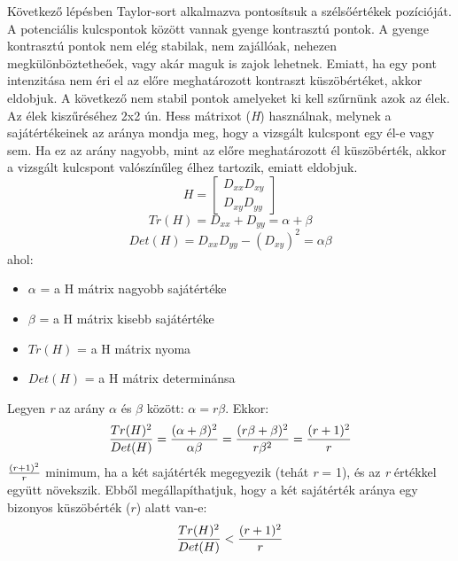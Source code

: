 \documentclass[12pt]{report}
\begin{document}
\begin{enumerate}
\begin{enumerate}
\begin{center}
                                    \end{center}
                                    Következő lépésben Taylor-sort alkalmazva pontosítsuk a szélsőértékek pozícióját. A potenciális kulcspontok között vannak gyenge kontrasztú pontok. A gyenge kontrasztú pontok nem elég stabilak, nem zajállóak, nehezen megkülönböztetheőek, vagy akár maguk is zajok lehetnek. Emiatt, ha egy pont intenzitása nem éri el az előre meghatározott kontraszt küszöbértéket, akkor eldobjuk. A következő nem stabil pontok amelyeket ki kell szűrnünk azok az élek. Az élek kiszűréséhez 2x2 ún. Hess mátrixot (\textit{H}) használnak, melynek a sajátértékeinek az aránya mondja meg, hogy a vizsgált kulcspont egy él-e vagy sem. Ha ez az arány nagyobb, mint az előre meghatározott él küszöbérték, akkor a vizsgált kulcspont valószínűleg élhez tartozik, emiatt eldobjuk.
                                        \[H = \begin{bmatrix} D_{xx} D_{xy} \\ D_{xy} D_{yy} \end{bmatrix}\]
                                        \[Tr(H) = D_{xx} + D_{yy} = \alpha + \beta\]
                                        \[Det(H) = D_{xx}D_{yy} - (D_{xy})^2 = \alpha\beta\]
                                    ahol:
                                    \begin{itemize}
                                        \item $\alpha$ = a H mátrix nagyobb sajátértéke
                                        \item $\beta$ = a H mátrix kisebb sajátértéke
                                        \item $Tr(H)$ = a H mátrix nyoma
                                        \item $Det(H)$ = a H mátrix determinánsa
                                    \end{itemize}
                                    Legyen \textit{r} az arány $\alpha$ és $\beta$ között: $\alpha = r\beta$. Ekkor:
                                    \[{Tr(H)^2\over{Det(H)}} = {(\alpha + \beta)^2\over{\alpha\beta}} = {(r\beta + \beta)^2\over{r\beta^2}} = {(r + 1)^2\over{r}}\]
                                    ${(r + 1)^2\over{r}}$ minimum, ha a két sajátérték megegyezik (tehát \textit{r} = 1), és az \textit{r} értékkel együtt növekszik. Ebből megállapíthatjuk, hogy a két sajátérték aránya egy bizonyos küszöbérték ($r$) alatt van-e:
                                    \[{Tr(H)^2\over{Det(H)}} < {(r + 1)^2\over{r}}\]


\end{enumerate}
\end{enumerate}
\end{document}
